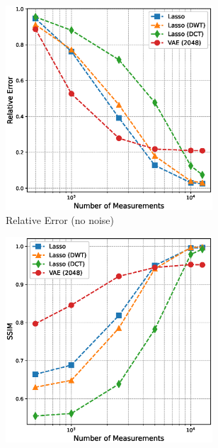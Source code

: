 \begin{figure}[htb]
    \centering
    \begin{subfigure}[b]{0.49\textwidth}
        \centering
        \includegraphics[width=0.85\textwidth]{figures/06_results/vae_benchmark/vae_vs_lasso/vae_vs_lasso_relative_error.eps}
        \caption{Relative Error (no noise)}
    \end{subfigure}
    \begin{subfigure}[b]{0.49\textwidth}
        \centering
        \includegraphics[width=0.85\textwidth]{figures/06_results/vae_benchmark/vae_vs_lasso/vae_vs_lasso_ssim.eps}

\end{subfigure}
\end{figure}
